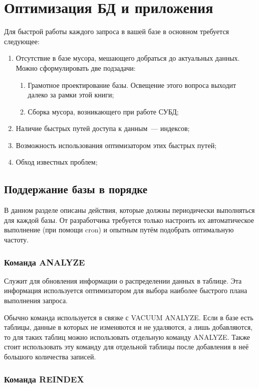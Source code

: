 \section{Оптимизация БД и приложения}
Для быстрой работы каждого запроса в вашей базе в основном требуется следующее:

\begin{enumerate}
  \item Отсутствие в базе мусора, мешающего добраться до актуальных данных. Можно сформулировать две подзадачи:
  \begin{enumerate}
    \item Грамотное проектирование базы. Освещение этого вопроса выходит далеко за рамки этой книги;
    \item Сборка мусора, возникающего при работе СУБД;
  \end{enumerate}
  \item Наличие быстрых путей доступа к данным~--- индексов;
  \item Возможность использования оптимизатором этих быстрых путей;
  \item Обход известных проблем;
\end{enumerate}


\subsection{Поддержание базы в порядке}

В данном разделе описаны действия, которые должны периодически выполняться для каждой базы. От разработчика требуется только настроить их автоматическое выполнение (при помощи cron) и опытным путём подобрать оптимальную частоту.


\subsubsection{Команда ANALYZE}

Служит для обновления информации о распределении данных в таблице. Эта информация используется оптимизатором для выбора наиболее быстрого плана выполнения запроса.

Обычно команда используется в связке с VACUUM ANALYZE. Если в базе есть таблицы, данные в которых не изменяются и не удаляются, а лишь добавляются, то для таких таблиц можно использовать отдельную команду ANALYZE. Также стоит использовать эту команду для отдельной таблицы после добавления в неё большого количества записей.


\subsubsection{Команда REINDEX}

